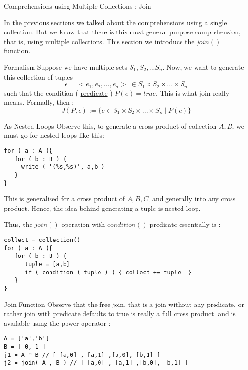 \begin{section}{Comprehensions using Multiple Collections : Join}

In the previous sections we talked about the comprehensions using a single collection.
But we know that there is this most general purpose comprehension, that is, 
using multiple collections. This section we introduce the $join()$ function.

\begin{subsection}{Formalism}
Suppose we have multiple sets $S_1,S_2,...S_n$.
Now, we want to generate this collection of tuples 
$$
e = <e_1,e_2,...,e_n> \; \in S_1 \times S_2 \times ... \times S_n
$$ 
such that the condition ( \href{https://en.wikipedia.org/wiki/Predicate\_(mathematical\_logic)}{predicate} ) $P(e) = true $. 
This is what join really means. Formally, then :
$$
J(P,e) := \{  e \in S_1 \times S_2 \times ... \times S_n \; | \; P(e) \} 
$$

\end{subsection}

\begin{subsection}{As Nested Loops}
Observe this, to generate a cross product of collection $A,B$, we must
go for nested loops like this:

\begin{lstlisting}[style=JexlStyle]
for ( a : A ){
   for ( b : B ) {
     write ( '(%s,%s)', a,b ) 
   }
}
\end{lstlisting}
This is generalised for a cross product of $A,B,C$, and generally into any cross product. 
Hence, the idea behind generating a tuple is nested loop.

Thus, the $join()$ operation with $condition()$ predicate essentially is :

\begin{lstlisting}[style=JexlStyle]
collect = collection()
for ( a : A ){
   for ( b : B ) {
      tuple = [a,b]
      if ( condition ( tuple ) ) { collect += tuple  } 
   }
}
\end{lstlisting}
\end{subsection}

\begin{subsection}{Join Function}
Observe that the free join, that is a join without any predicate, 
or rather join with predicate defaults to true is really a full cross product, 
and is available using the power operator :

\begin{lstlisting}[style=JexlStyle]
A = ['a','b']
B = [ 0, 1 ]
j1 = A * B // [ [a,0] , [a,1] ,[b,0], [b,1] ]
j2 = join( A , B ) // [ [a,0] , [a,1] ,[b,0], [b,1] ]
\end{lstlisting}


\end{subsection}
\end{section}
